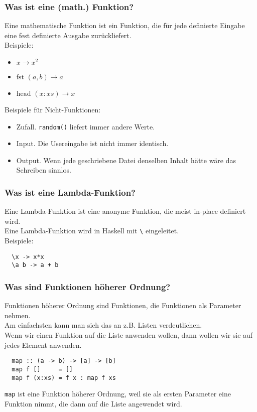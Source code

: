 \documentclass{beamer}
\begin{document}
\begin{frame}[fragile]
 \frametitle{Was ist eine (math.) Funktion?}
 Eine mathematische Funktion ist ein Funktion, die für jede definierte Eingabe eine fest definierte Ausgabe zurückliefert.\\\vspace*{0.5cm}
 \pause
 Beispiele:
 \pause
 \begin{itemize}
  \item $x \rightarrow x^2$
  \pause
  \item $\textrm{fst } (a,b) \rightarrow a$
  \pause
  \item $\textrm{head } (x:xs) \rightarrow x$
 \end{itemize}
 \pause
 Beispiele für Nicht-Funktionen:
 \pause
 \begin{itemize}
  \item Zufall. \texttt{random()} liefert immer andere Werte.
  \pause
  \item Input. Die Usereingabe ist nicht immer identisch.
  \pause
  \item Output. Wenn jede geschriebene Datei denselben Inhalt hätte wäre das Schreiben sinnlos.
 \end{itemize}
\end{frame}

\begin{frame}[fragile]
 \frametitle{Was ist eine Lambda-Funktion?}
 Eine Lambda-Funktion ist eine anonyme Funktion, die meist in-place definiert wird.\\
 \pause
 Eine Lambda-Funktion wird in Haskell mit \texttt{\textbackslash} eingeleitet.\\\vspace*{0.5cm}
 \pause
 Beispiele:
 \pause
 \begin{lstlisting}
  \x -> x*x
  \a b -> a + b
 \end{lstlisting}
\end{frame}

\begin{frame}[fragile]
 \frametitle{Was sind Funktionen höherer Ordnung?}
 Funktionen höherer Ordnung sind Funktionen, die Funktionen als Parameter nehmen.\\\vspace*{0.5cm}
 \pause
 Am einfachsten kann man sich das an z.B. Listen verdeutlichen.\\
 \pause
 Wenn wir einen Funktion auf die Liste anwenden wollen, dann wollen wir sie auf jedes Element anwenden.\\
 \pause
 \begin{lstlisting}
  map :: (a -> b) -> [a] -> [b]
  map f []     = []
  map f (x:xs) = f x : map f xs
 \end{lstlisting}
 \pause
 \texttt{map} ist eine Funktion höherer Ordnung, weil sie als ersten Parameter eine Funktion nimmt, die dann auf die Liste angewendet wird.
\end{frame}
\end{document}
